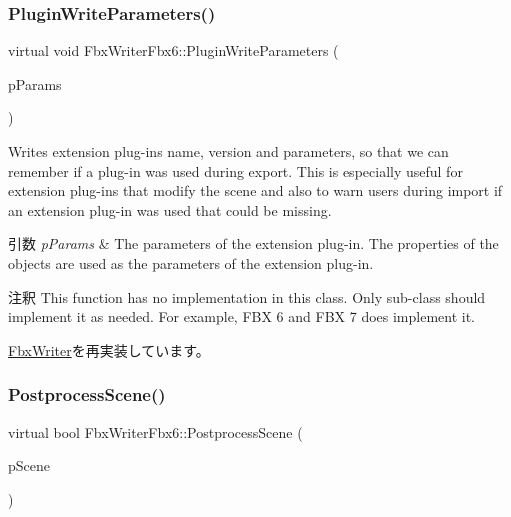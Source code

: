 \mbox{\label{class_fbx_writer_fbx6_a2dd451ffa9e15aca1f5130c7334163a4}} 
\subsubsection{\texorpdfstring{Plugin\+Write\+Parameters()}{PluginWriteParameters()}}
{\footnotesize\ttfamily virtual void Fbx\+Writer\+Fbx6\+::\+Plugin\+Write\+Parameters (\begin{DoxyParamCaption}\item[{\hyperlink{class_fbx_object}{Fbx\+Object} \&}]{p\+Params }\end{DoxyParamCaption})\hspace{0.3cm}{\ttfamily [virtual]}}

Writes extension plug-\/ins name, version and parameters, so that we can remember if a plug-\/in was used during export. This is especially useful for extension plug-\/ins that modify the scene and also to warn users during import if an extension plug-\/in was used that could be missing. 
\begin{DoxyParams}{引数}
{\em p\+Params} & The parameters of the extension plug-\/in. The properties of the objects are used as the parameters of the extension plug-\/in. \\
\hline
\end{DoxyParams}
\begin{DoxyRemark}{注釈}
This function has no implementation in this class. Only sub-\/class should implement it as needed. For example, F\+BX 6 and F\+BX 7 does implement it. 
\end{DoxyRemark}


\hyperlink{class_fbx_writer_a851219ad904ebdce34acd3b8699cb0c8}{Fbx\+Writer}を再実装しています。

\mbox{\label{class_fbx_writer_fbx6_a9a595d04ed83c441705a4be5720e97dc}} 
\subsubsection{\texorpdfstring{Postprocess\+Scene()}{PostprocessScene()}}
{\footnotesize\ttfamily virtual bool Fbx\+Writer\+Fbx6\+::\+Postprocess\+Scene (\begin{DoxyParamCaption}\item[{\hyperlink{class_fbx_scene}{Fbx\+Scene} \&}]{p\+Scene }\end{DoxyParamCaption})\hspace{0.3cm}{\ttfamily [virtual]}}

